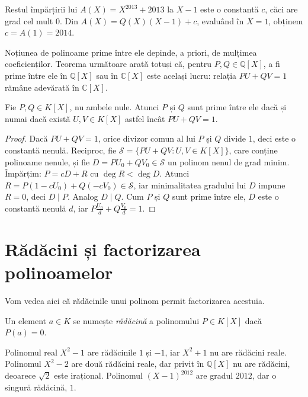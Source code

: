 \begin{exemplu}
Restul împărțirii lui $A(X) = X^{2013} + 2013$ la $X - 1$ este o constantă $c$, căci are grad cel mult $0$. Din $A(X) = Q(X)(X-1) + c$, evaluând în $X = 1$, obținem $c = A(1) = 2014$.
\end{exemplu}

\begin{observatie}
Noțiunea de polinoame prime între ele depinde, a priori, de mulțimea coeficienților. Teorema următoare arată totuși că, pentru $P,Q\in\mathbb{Q}[X]$, a fi prime între ele în $\mathbb{Q}[X]$ sau în $\mathbb{C}[X]$ este același lucru: relația $PU+QV=1$ rămâne adevărată în $\mathbb{C}[X]$.
\end{observatie}

\begin{teorema}[Bézout]\label{teo:bezout}
Fie $P, Q \in K[X]$, nu ambele nule. Atunci $P$ și $Q$ sunt prime între ele dacă și numai dacă există $U, V \in K[X]$ astfel încât $PU + QV = 1$.
\end{teorema}

\begin{proof}
Dacă $PU + QV = 1$, orice divizor comun al lui $P$ și $Q$ divide $1$, deci este o constantă nenulă. Reciproc, fie $\mathcal{S} = \{PU + QV : U, V \in K[X]\}$, care conține polinoame nenule, și fie $D = PU_0 + QV_0 \in \mathcal{S}$ un polinom nenul de grad minim. Împărțim: $P = cD + R$ cu $\deg R < \deg D$. Atunci $R = P(1 - cU_0) + Q(-cV_0) \in \mathcal{S}$, iar minimalitatea gradului lui $D$ impune $R = 0$, deci $D \mid P$. Analog $D \mid Q$. Cum $P$ și $Q$ sunt prime între ele, $D$ este o constantă nenulă $d$, iar $P\frac{U_0}{d} + Q\frac{V_0}{d} = 1$.
\end{proof}

\section{Rădăcini și factorizarea polinoamelor}

Vom vedea aici că rădăcinile unui polinom permit factorizarea acestuia.

\begin{definitie}
Un element $a \in K$ se numește \emph{rădăcină} a polinomului $P \in K[X]$ dacă $P(a) = 0$.
\end{definitie}

\begin{exemplu}
Polinomul real $X^2 - 1$ are rădăcinile $1$ și $-1$, iar $X^2 + 1$ nu are rădăcini reale. Polinomul $X^2 - 2$ are două rădăcini reale, dar privit în $\mathbb{Q}[X]$ nu are rădăcini, deoarece $\sqrt{2}$ este irațional. Polinomul $(X - 1)^{2012}$ are gradul $2012$, dar o singură rădăcină, $1$.
\end{exemplu}

